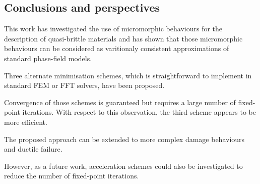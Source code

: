 \subsection{Conclusions and perspectives}

This work has investigated the use of micromorphic behaviours for the
description of quasi-brittle materials and has shown that those
micromorphic behaviours can be considered as varitionaly consistent
approximations of standard phase-field models.

Three alternate minimisation schemes, which is straightforward to
implement in standard FEM or FFT solvers, have been proposed.

Convergence of those schemes is guaranteed but requires a large number
of fixed-point iterations. With respect to this observation, the third
scheme appears to be more efficient.

The proposed approach can be extended to more complex damage behaviours
and ductile failure.

However, as a future work, acceleration schemes could also be
investigated to reduce the number of fixed-point iterations.
